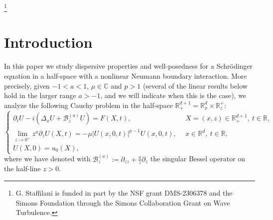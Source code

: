 \documentclass[11pt,letter]{amsart}
\def \RN {\mathbb{R}_+^{d+1}}
\def \R {\mathbb{R}}
\newcommand{\Ba}{\mathscr B_z^{(a)}}
\newcommand{\Rd}{\mathbb R^d}
\newcommand{\p}{\partial}
\numberwithin{equation}{section}
\newcommand{\C}{\mathbb{C}}
\numberwithin{equation}{section}
\begin{document}
\author{Nicola Garofalo}
\address{School of Mathematical and Statistical Sciences\\ Arizona State University}

\author{Gigliola Staffilani}
\address{Department of Mathematics\\ Massachusetts Institute of Technology\\
Cambridge, Massachusetts, 02141\\USA}

\thanks{G. Staffilani is funded in part by the NSF grant DMS-2306378 and the Simons Foundation through the
Simons Collaboration Grant on Wave Turbulence.}
	
\maketitle
	
\tableofcontents

\section{Introduction}


In this paper we study dispersive properties and  well-posedness for a Schr\"odinger equation in a half-space with a nonlinear Neumann boundary interaction. More precisely, given $-1<a<1$, $\mu\in \C$ and $p>1$ (several of the linear results below hold in the larger range $a>-1$, and we will indicate when this is the case), we analyze the following Cauchy problem in the half-space $\RN = \Rd_x \times \R^+_z$: 
\begin{equation}\label{cp02}
\begin{cases}
\p_t U - i(\Delta_x U + \Ba U) = F(X,t), & \ \ X=(x,z)\in \mathbb{R}^{d+1}_+,\ t\in \mathbb R, \\
\displaystyle \lim_{z\to 0^+} z^a \p_z U(X,t) = -\mu |U(x,0,t)|^{p-1}U(x,0,t), & \ \ x\in \Rd,\ t\in \R, \\
U(X,0)=u_0(X), 
\end{cases}
\end{equation}
where we have denoted with $\Ba := \p_{zz}  + \frac az \p_z$
the singular Bessel operator on the half-line $z>0$. 
\end{document}

